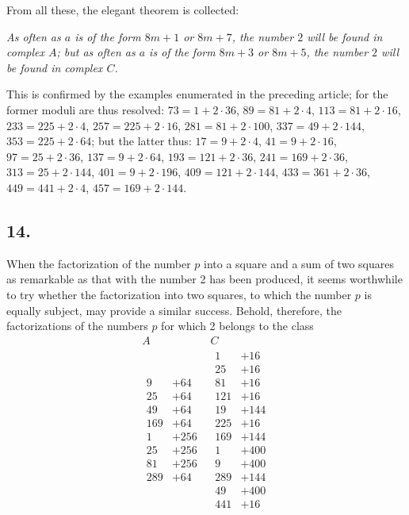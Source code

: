 \documentclass[twoside,12pt, showframe]{memoir}
\begin{document}
From all these, the elegant theorem is collected:

\textit{As often as \(a\) is of the form \(8m+1\) or \(8m+7\), the number \(2\) will be found in complex \(A\); but as often as \(a\) is of the form \(8m+3\) or \(8m+5\), the number \(2\) will be found in complex \(C\).}

This is confirmed by the examples enumerated in the preceding article; for the former moduli are thus resolved: \(73=1+2\cdot36\), \(89=81+2\cdot4\), \(113=81+2\cdot16\), \(233=225+2\cdot4\), \(257=225+2\cdot16\), \(281=81+2\cdot100\), \(337=49+2\cdot144\), \(353=225+2\cdot64\); but the latter thus: \(17=9+2\cdot4\), \(41=9+2\cdot16\), \(97=25+2\cdot36\), \(137=9+2\cdot64\), \(193=121+2\cdot36\), \(241=169+2\cdot36\), \(313=25+2\cdot144\), \(401=9+2\cdot196\), \(409=121+2\cdot144\), \(433=361+2\cdot36\), \(449=441+2\cdot4\), \(457=169+2\cdot144\).
%

\subsection*{14.}

When the factorization of the number \(p\) into a square and a sum of two squares as remarkable as that with the number 2 has been produced, it seems worthwhile to try whether the factorization into two squares, to which the number \(p\) is equally subject, may provide a similar success. Behold, therefore, the factorizations of the numbers \(p\) for which 2 belongs to the class
\[\begin{array}{c|c}
A & C  \\[2pt]
\hline 
\begin{aligned}
9&+64  \\
25&+64  \\
49&+64 \\
169&+64\\
1&+256 \\
25&+256\\
81&+256\\
289&+64
 \end{aligned}
&
\begin{aligned}
 1&+16\\
 25&+16\\
 81&+16\\
 121&+16\\
 19&+144\\
225&+16\\
169&+144\\
1&+400\\
9&+400\\
289&+144\\
49&+400\\
441&+16 
\end{aligned}
\end{array}\]
%
\end{document}
